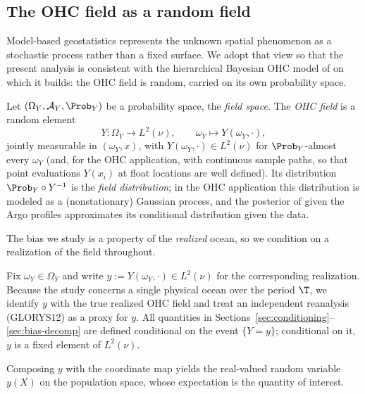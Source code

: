 \subsection{The OHC field as a random field}
\label{sec:field}

Model-based geostatistics represents the unknown spatial phenomenon as
a stochastic process rather than a fixed surface. We adopt that view so
that the present analysis is consistent with the hierarchical Bayesian
OHC model of \citet{baugh2022} on which it builds: the OHC field is
random, carried on its own probability space.

\begin{definition}
\label{def:Y}
Let $(\Omega_Y,\mathcal{A}_Y,\Prob_Y)$ be a probability space, the
\emph{field space}. The \emph{OHC field} is a random element
\[
  Y : \Omega_Y \to L^2(\nu), \qquad \omega_Y \mapsto Y(\omega_Y,\cdot),
\]
jointly measurable in $(\omega_Y,x)$, with $Y(\omega_Y,\cdot)\in L^2(\nu)$
for $\Prob_Y$-almost every $\omega_Y$ (and, for the OHC application,
with continuous sample paths, so that point evaluations $Y(x_i)$ at
float locations are well defined). Its distribution $\Prob_Y\circ Y^{-1}$ is the
\emph{field distribution}; in the OHC application this distribution is modeled
as a (nonstationary) Gaussian process, and the posterior of \citet{baugh2022} given the Argo profiles approximates its conditional
distribution given the data.
\end{definition}

The bias we study is a property of the \emph{realized} ocean, so we
condition on a realization of the field throughout.

\begin{definition}
\label{def:realization}
Fix $\omega_Y\in\Omega_Y$ and write $y := Y(\omega_Y,\cdot)\in L^2(\nu)$
for the corresponding realization. Because the study concerns a single
physical ocean over the period $\T$, we identify $y$ with the true
realized OHC field and treat an independent reanalysis (GLORYS12) as a
proxy for $y$. All quantities in
Sections~\ref{sec:conditioning}--\ref{sec:bias-decomp} are defined
conditional on the event $\{Y = y\}$; conditional on it, $y$ is a fixed
element of $L^2(\nu)$.
\end{definition}

Composing $y$ with the coordinate map yields the real-valued random
variable $y(X)$ on the population space, whose expectation is the
quantity of interest.


